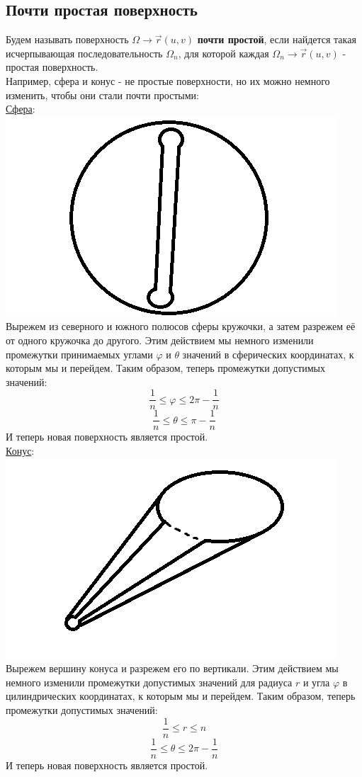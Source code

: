 \documentclass[12pt]{article}
\begin{document}
\subsection{Почти простая поверхность}
Будем называть поверхность $\Omega \to \overrightarrow{r}(u,v)$ \textbf{почти простой}, если найдется такая исчерпывающая последовательность $\Omega_n$, для которой  каждая $\Omega_n \to \overrightarrow{r}(u,v)$ - простая поверхность.\\
Например, сфера и конус - не простые поверхности, но их можно немного изменить, чтобы они стали почти простыми:\\
\uline{Сфера}:\\
\includegraphics{sphereNotSimple}\\
Вырежем из северного и южного полюсов сферы кружочки, а затем разрежем её от одного кружочка до другого. Этим действием мы немного изменили промежутки принимаемых углами $\varphi$ и $\theta$ значений в сферических координатах, к которым мы и перейдем. Таким образом, теперь промежутки допустимых значений:\\
$$\frac{1}{n} \leq \varphi \leq 2 \pi - \frac{1}{n}$$
$$\frac{1}{n} \leq \theta \leq \pi - \frac{1}{n}$$
И теперь новая поверхность является простой.\\
\uline{Конус}:\\
\includegraphics{coneNotSimple}\\
Вырежем вершину конуса и разрежем его по вертикали. Этим действием мы немного изменили промежутки допустимых значений для радиуса $r$ и угла $\varphi$ в цилиндрических координатах, к которым мы и перейдем. Таким образом, теперь промежутки допустимых значений:\\
$$\frac{1}{n} \leq r \leq n$$
$$\frac{1}{n} \leq \theta \leq 2 \pi - \frac{1}{n}$$
И теперь новая поверхность является простой.\\
\end{document}
